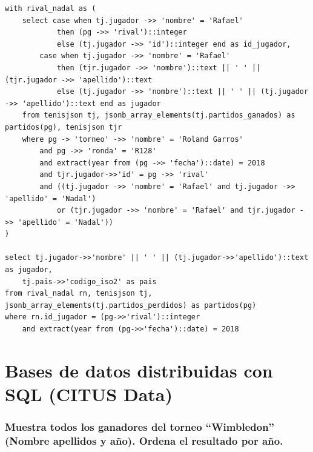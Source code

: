 \documentclass[11pt]{opticajnl}
\begin{document}
\begin{verbatim}
with rival_nadal as (
	select case when tj.jugador ->> 'nombre' = 'Rafael' 
			then (pg ->> 'rival')::integer  
			else (tj.jugador ->> 'id')::integer end as id_jugador,
		case when tj.jugador ->> 'nombre' = 'Rafael' 
			then (tjr.jugador ->> 'nombre')::text || ' ' || (tjr.jugador ->> 'apellido')::text 
			else (tj.jugador ->> 'nombre')::text || ' ' || (tj.jugador ->> 'apellido')::text end as jugador
	from tenisjson tj, jsonb_array_elements(tj.partidos_ganados) as partidos(pg), tenisjson tjr
    where pg -> 'torneo' ->> 'nombre' = 'Roland Garros' 
    	and pg ->> 'ronda' = 'R128'
		and extract(year from (pg ->> 'fecha')::date) = 2018
        and tjr.jugador->>'id' = pg ->> 'rival'
        and ((tj.jugador ->> 'nombre' = 'Rafael' and tj.jugador ->> 'apellido' = 'Nadal') 
        	or (tjr.jugador ->> 'nombre' = 'Rafael' and tjr.jugador ->> 'apellido' = 'Nadal'))
)

select tj.jugador->>'nombre' || ' ' || (tj.jugador->>'apellido')::text as jugador, 
	tj.pais->>'codigo_iso2' as pais
from rival_nadal rn, tenisjson tj, jsonb_array_elements(tj.partidos_perdidos) as partidos(pg)
where rn.id_jugador = (pg->>'rival')::integer 
	and extract(year from (pg->>'fecha')::date) = 2018
\end{verbatim}


































\section{Bases de datos distribuidas con SQL (CITUS Data)}

\subsubsection{Muestra todos los ganadores del torneo ``Wimbledon'' (Nombre apellidos y año). Ordena el resultado por año.}
\end{document}
